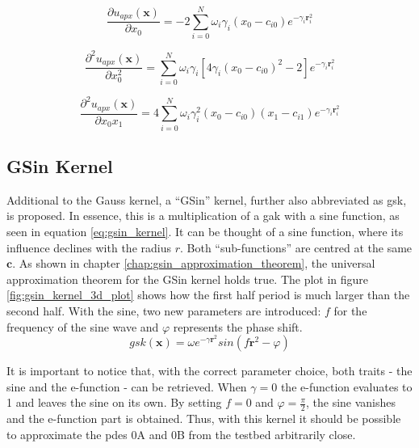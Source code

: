 \documentclass[./\jobname.tex]{subfiles}
\begin{document}
\begin{equation}
\label{eq:uapx_gauss_kernel_x0}
\frac{\partial u_{apx}(\mathbf{x})}{\partial x_0} = -2 \sum_{i=0}^{N} \omega_i \gamma_i (x_0 - c_{i0}) e^{-\gamma_i \mathbf{r}_i^2}
\end{equation}

\begin{equation}
\label{eq:uapx_gauss_kernel_x0x0}
\frac{\partial^2 u_{apx}(\mathbf{x})}{\partial x_0^2} = \sum_{i=0}^{N} \omega_i \gamma_i \left[ 4 \gamma_i (x_0 - c_{i0})^2 - 2 \right] e^{-\gamma_i \mathbf{r}_i^2}
\end{equation}

\begin{equation}
\label{eq:uapx_gauss_kernel_x0x1}
\frac{\partial^2 u_{apx}(\mathbf{x})}{\partial x_0 x_1} = 4 \sum_{i=0}^{N} \omega_i \gamma_i^2 (x_0 - c_{i0}) (x_1 - c_{i1}) e^{-\gamma_i \mathbf{r}_i^2} 
\end{equation}

\subsection{GSin Kernel}
\label{chap:gsin_kernel}
Additional to the Gauss kernel, a ``GSin'' kernel, further also abbreviated as \gls{gsk}, is proposed. In essence, this is a multiplication of a \gls{gak} with a sine function, as seen in equation \ref{eq:gsin_kernel}. It can be thought of a sine function, where its influence declines with the radius $r$. Both ``sub-functions'' are centred at the same $\mathbf{c}$. As shown in chapter \ref{chap:gsin_approximation_theorem}, the universal approximation theorem for the GSin kernel holds true. 
The plot in figure \ref{fig:gsin_kernel_3d_plot} shows how the first half period is much larger than the second half. With the sine, two new parameters are introduced: $f$ for the frequency of the sine wave and $\varphi$ represents the phase shift. 
\begin{equation}
\label{eq:gsin_kernel}
gsk(\mathbf{x}) = \omega e^{-\gamma \mathbf{r}^2} sin(f \mathbf{r}^2 - \varphi)
\end{equation}

It is important to notice that, with the correct parameter choice, both traits - the sine and the e-function - can be retrieved. When $\gamma=0$ the e-function evaluates to 1 and leaves the sine on its own. By setting $f=0$ and $\varphi=\frac{\pi}{2}$, the sine vanishes and the e-function part is obtained. Thus, with this kernel it should be possible to approximate the \gls{pde}s 0A and 0B from the testbed arbitrarily close. 
\end{document}
